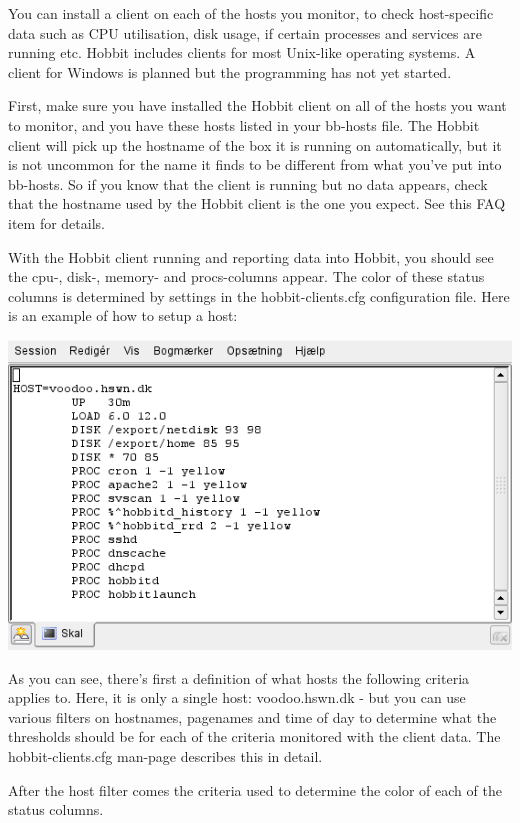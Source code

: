  You can install a client on each of the hosts you monitor, to check host-specific data such as CPU utilisation, disk usage, if certain processes and services are running etc. Hobbit includes clients for most Unix-like operating systems. A client for Windows is planned but the programming has not yet started.


 First, make sure you have installed the Hobbit client on all of the hosts you want to monitor, and you have these hosts listed in your bb-hosts file. The Hobbit client will pick up the hostname of the box it is running on automatically, but it is not uncommon for the name it finds to be different from what you've put into bb-hosts. So if you know that the client is running but no data appears, check that the hostname used by the Hobbit client is the one you expect. See this FAQ item for details.


 With the Hobbit client running and reporting data into Hobbit, you should see the cpu-, disk-, memory- and procs-columns appear. The color of these status columns is determined by settings in the  hobbit-clients.cfg configuration file. Here is an example of how to setup a host:


 \includegraphics[scale=0.5]{./hobbit-clients.png} 


 As you can see, there's first a definition of what hosts the following criteria applies to. Here, it is only a single host: voodoo.hswn.dk - but you can use various filters on hostnames, pagenames and time of day to determine what the thresholds should be for each of the criteria monitored with the client data. The hobbit-clients.cfg man-page describes this in detail.


 After the host filter comes the criteria used to determine the color of each of the status columns.


